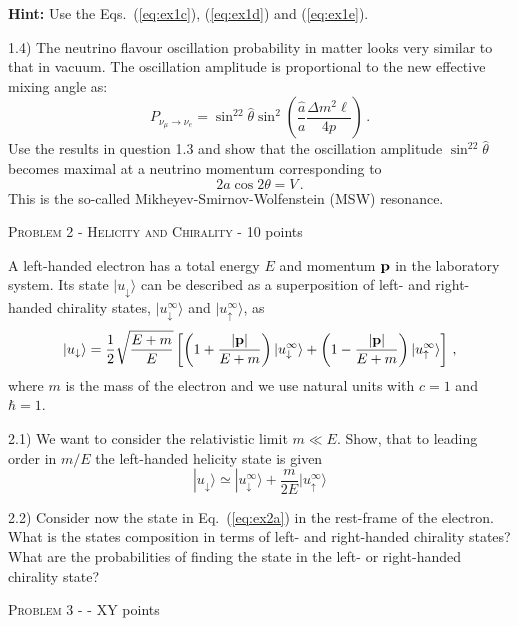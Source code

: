 \documentclass[a4paper,11pt]{report}
\begin{document}
{\bf Hint:} Use the Eqs.~(\ref{eq:ex1c}), (\ref{eq:ex1d}) and (\ref{eq:ex1e}).

1.4) The neutrino flavour oscillation probability in matter looks very similar to that in vacuum. The oscillation amplitude is proportional to the new effective mixing angle as:
\begin{equation}
P_{\nu_\mu\to\nu_e} = \sin^22\hat{\theta}\sin^2\left(\frac{\hat{a}}{a}\frac{\Delta m^2\ell}{4p}\right)\,.
\end{equation}
Use the results in question 1.3 and show that the oscillation amplitude $\sin^22\hat{\theta}$ becomes maximal at a neutrino momentum corresponding to 
\begin{equation}
2a\cos2\theta = V\,.
\end{equation} 
This is the so-called Mikheyev-Smirnov-Wolfenstein (MSW) resonance.
\vspace{1cm}

{\large \textsc{Problem 2 - Helicity and Chirality} - 10 points}

A left-handed electron has a total energy $E$ and momentum ${\bf p}$ in the laboratory system. Its state $|u_\downarrow\rangle$ can be described as a superposition of left- and right-handed chirality states, $|u_\downarrow^\infty\rangle$ and $|u_\uparrow^\infty\rangle$, as 
\begin{equation}\label{eq:ex2a}
|u_\downarrow\rangle =\frac{1}{2}\sqrt{\frac{E+m}{E}}\left[ \left(1+\frac{|{\bf p}|}{E+m}\right)|u_\downarrow^\infty\rangle+\left(1-\frac{|{\bf p}|}{E+m}\right)|u_\uparrow^\infty\rangle\right]\,,
\end{equation}
where $m$ is the mass of the electron and we use natural units with $c=1$ and $\hbar=1$.

2.1) We want to consider the relativistic limit $m\ll E$. Show, that to leading order in $m/E$ the left-handed helicity state is given
\[
|u_\downarrow\rangle \simeq |u_\downarrow^\infty\rangle +\frac{m}{2E}|u_\uparrow^\infty\rangle
\]

2.2) Consider now the state in Eq.~(\ref{eq:ex2a}) in the rest-frame of the electron. What is the states composition in terms of left- and right-handed chirality states? What are the probabilities of finding the state in the left- or right-handed chirality state?

\vspace{1cm}

{\large \textsc{Problem 3 - } - XY points}
\end{document}
